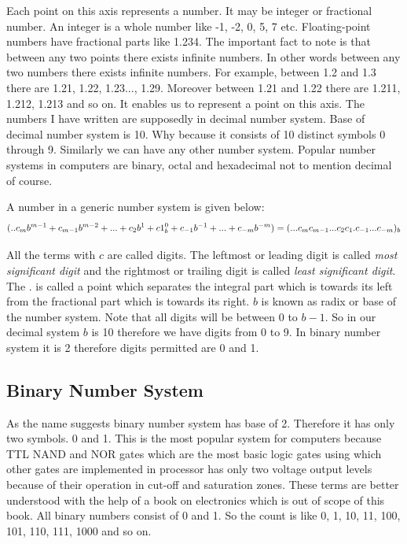 Each point on this axis represents a number. It may be integer or fractional
number. An integer is a whole number like -1, -2, 0, 5, 7 etc. Floating-point
numbers have fractional parts like 1.234. The important fact to note is that
between any two points there exists infinite numbers. In other words between
any two numbers there exists infinite numbers. For example, between 1.2 and 1.3
there are 1.21, 1.22, 1.23..., 1.29. Moreover between 1.21 and 1.22 there are
1.211, 1.212, 1.213 and so on. It enables us to represent a point on this
axis. The numbers I have written are supposedly in decimal number system. Base
of decimal number system is 10. Why because it consists of 10 distinct symbols
0 through 9. Similarly we can have any other number system. Popular number
systems in computers are binary, octal and hexadecimal not to mention decimal
of course.

A number in a generic number system is given below:
\begin{equation}
(.. c_mb^{m-1} + c_{m-1}b^{m-2}+ ... + c_2b^1 + c1_b^0 + c_{-1}b^{-1} +
... + c_{-m}b^{-m} ) \\ = (... c_mc_{m-1}...c_2c_1.c_{-1}...c_{-m})_b
\end{equation}

All the terms with $c$  are called digits. The leftmost or leading digit is
called \textit{most significant digit} and the rightmost or trailing digit is
called \textit{least significant digit}. The . is called a point which
separates the integral part which is towards its left from the fractional part
which is towards its right. $b$  is known as radix or base of the number
system. Note that all digits will be between $0$ to $b-1$. So in our decimal
system $b$  is 10 therefore we have digits from 0 to 9. In binary number system
it is 2 therefore digits permitted are 0 and 1.

\subsection{Binary Number System}
\label{bns}
As the name suggests binary number system has base of 2. Therefore it has only
two symbols. 0 and 1. This is the most popular system for computers because TTL
NAND and NOR gates which are the most basic logic gates using which other gates
are implemented in processor has only two voltage output levels because of
their operation in cut-off and saturation zones. These terms are better
understood with the help of a book on electronics which is out of scope of this
book. All binary numbers consist of 0 and 1. So the count is like 0, 1, 10, 11,
100, 101, 110, 111, 1000 and so on.

